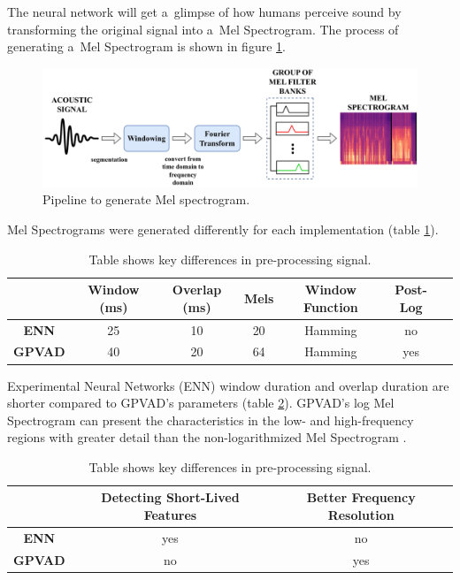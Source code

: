     The neural network will get a~glimpse of how humans perceive sound by transforming the original signal into a~Mel Spectrogram. 
    The process of generating a~Mel Spectrogram is shown in figure \ref{fig:SIGNALMELPIPELINE}.

    \begin{figure}[ht!]
        \centering
        \includegraphics[width = \textwidth]{obrazky-figures/mel_pipeline.pdf}
        \caption{Pipeline to generate Mel spectrogram.}
        \label{fig:SIGNALMELPIPELINE}
    \end{figure}

    Mel Spectrograms were generated differently for each implementation (table \ref{tab:comparsionFNNGPVAD_mel}).

    \begin{table}[ht!]
        \centering
        \begin{tabular}{|c|c|c|c|c|c|c|} \hline
            & \textbf{Window (ms)} & \textbf{Overlap (ms)} & \textbf{Mels} & \textbf{Window Function} & \textbf{Post-Log} \\  \hline
            \textbf{ENN} & 25 & 10 & 20 & Hamming & no\\ \hline
            \textbf{GPVAD} & 40 & 20 & 64 & Hamming & yes \\\hline
        \end{tabular}
        \caption{Table shows key differences in pre-processing signal.}
        \label{tab:comparsionFNNGPVAD_mel}
    \end{table}

     Experimental Neural Networks (ENN) window duration and overlap duration are shorter compared to GPVAD's \cite{Dinkel2020, Dinkel2021} parameters (table \ref{tab:comparsionFNNGPVAD_disadv}). GPVAD's log Mel Spectrogram can present the characteristics in the low- and high-frequency regions with greater detail than the non-logarithmized Mel Spectrogram \cite{Seo_Kim_Kim_2022}.

    \begin{table}[ht!]
        \centering
        \begin{tabular}{|c|c|c|} \hline
            & \textbf{Detecting Short-Lived Features} & \textbf{Better Frequency Resolution} \\  \hline
            \textbf{ENN} & yes & no \\ \hline
            \textbf{GPVAD} & no & yes\\ \hline
        \end{tabular}
        \caption{Table shows key differences in pre-processing signal.}
        \label{tab:comparsionFNNGPVAD_disadv}
    \end{table}

